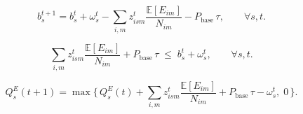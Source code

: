 
\begin{equation}
b_s^{t+1} = b_s^t + \omega_s^t
   - \sum_{i,m} z_{ism}^t \frac{\mathbb{E}[E_{im}]}{N_{im}}
   - P_{\text{base}}\,\tau, \qquad \forall s,t.
\end{equation}

\begin{equation}
\sum_{i,m} z_{ism}^t \frac{\mathbb{E}[E_{im}]}{N_{im}} + P_{\text{base}}\,\tau
   \;\le\; b_s^t + \omega_s^t, \qquad \forall s,t.
\end{equation}

\begin{equation}
Q_s^E(t+1) = \max\!\Big\{\, Q_s^E(t)
   + \sum_{i,m} z_{ism}^t \frac{\mathbb{E}[E_{im}]}{N_{im}}
   + P_{\text{base}}\,\tau - \omega_s^t,\; 0 \,\Big\}.
\end{equation}


